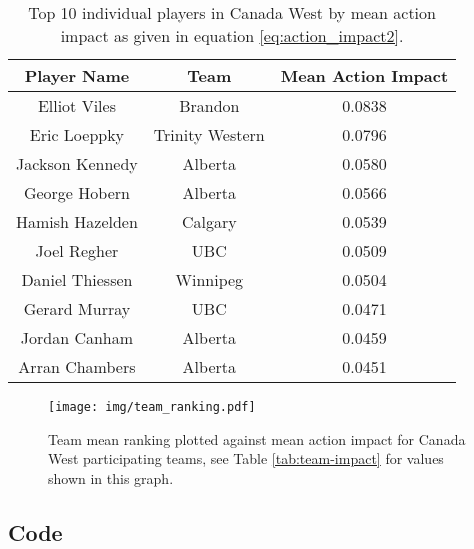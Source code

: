 \documentclass{sfuthesis}
\begin{document}
	\begin{table}
		\centering
		\begin{tabular}{ccc}
			\textbf{Player Name} & \textbf{Team}   & \textbf{Mean Action Impact} \\ \hline
			Elliot Viles         & Brandon         & 0.0838                      \\
			Eric Loeppky         & Trinity Western & 0.0796                      \\
			Jackson Kennedy      & Alberta         & 0.0580                      \\
			George Hobern        & Alberta         & 0.0566                      \\
			Hamish Hazelden      & Calgary         & 0.0539                      \\
			Joel Regher          & UBC             & 0.0509                      \\
			Daniel Thiessen      & Winnipeg        & 0.0504                      \\
			Gerard Murray        & UBC             & 0.0471                      \\
			Jordan Canham        & Alberta         & 0.0459                      \\
			Arran Chambers       & Alberta         & 0.0451                     
		\end{tabular}
		\caption{Top 10 individual players in Canada West by mean action impact as given in equation \eqref{eq:action_impact2}.}
		\label{tab:player-impact}
	\end{table}
	
	\begin{figure}
		\texttt{[image: img/team\_ranking.pdf]}
		\caption{Team mean ranking plotted against mean action impact for Canada West participating teams, see Table \ref{tab:team-impact} for values shown in this graph.}
		\label{fig:team-impact}
	\end{figure}
	
	
	\backmatter%
	
	
	
	\begin{appendices} %
		\chapter{Code}
	\end{appendices}
\end{document}
